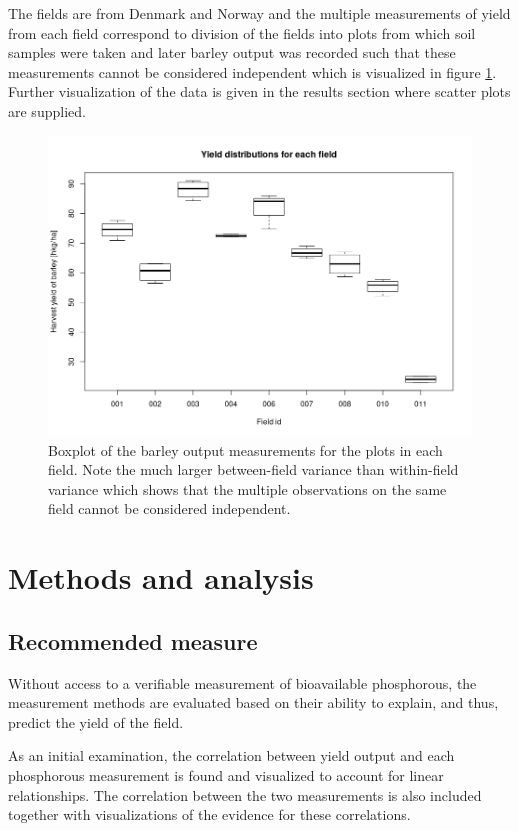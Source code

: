 \documentclass[11pt,fleqn]{article}
\begin{document}
The fields are from Denmark and Norway and the multiple measurements of yield from each field correspond to division of the fields into plots from which soil samples were taken and later barley output was recorded such that these measurements cannot be considered independent which is visualized in figure \ref{fig:fieldbox}. Further visualization of the data is given in the results section where scatter plots are supplied.
\begin{figure}[H]
	\centering
	\includegraphics[width=.7\linewidth]{p2_fieldbox}
	\caption{Boxplot of the barley output measurements for the plots in each field. Note the much larger between-field variance than within-field variance which shows that the multiple observations on the same field cannot be considered independent.}
	\label{fig:fieldbox}
\end{figure}
\section{Methods and analysis}
\subsection{Recommended measure}
Without access to a verifiable measurement of bioavailable phosphorous, the measurement methods are evaluated based on their ability to explain, and thus, predict the yield of the field. 

As an initial examination, the correlation between yield output and each phosphorous measurement is found and visualized to account for linear relationships. The correlation between the two measurements is also included together with visualizations of the evidence for these correlations.
\end{document}
